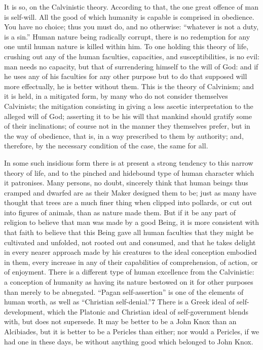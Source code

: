 \documentclass[11pt,openany]{book}
\begin{document}
It is so, on the Calvinistic theory. According to that, the one great offence of man is self-will. All the good of which humanity is capable is comprised in obedience. You have no choice; thus you must do, and no otherwise: ``whatever is not a duty, is a sin.'' Human nature being radically corrupt, there is no redemption for any one until human nature is killed within him. To one holding this theory of life, crushing out any of the human faculties, capacities, and susceptibilities, is no evil: man needs no capacity, but that of surrendering himself to the will of God: and if he uses any of his faculties for any other purpose but to do that supposed will more effectually, he is better without them. This is the theory of Calvinism; and it is held, in a mitigated form, by many who do not consider themselves Calvinists; the mitigation consisting in giving a less ascetic interpretation to the alleged will of God; asserting it to be his will that mankind should gratify some of their inclinations; of course not in the manner they themselves prefer, but in the way of obedience, that is, in a way prescribed to them by authority; and, therefore, by the necessary condition of the case, the same for all.

In some such insidious form there is at present a strong tendency to this narrow theory of life, and to the pinched and hidebound type of human character which it patronises. Many persons, no doubt, sincerely think that human beings thus cramped and dwarfed are as their Maker designed them to be; just as many have thought that trees are a much finer thing when clipped into pollards, or cut out into figures of animals, than as nature made them. But if it be any part of religion to believe that man was made by a good Being, it is more consistent with that faith to believe that this Being gave all human faculties that they might be cultivated and unfolded, not rooted out and consumed, and that he takes delight in every nearer approach made by his creatures to the ideal conception embodied in them, every increase in any of their capabilities of comprehension, of action, or of enjoyment. There is a different type of human excellence from the Calvinistic: a conception of humanity as having its nature bestowed on it for other purposes than merely to be abnegated. ``Pagan self-assertion'' is one of the elements of human worth, as well as ``Christian self-denial.''7 There is a Greek ideal of self-development, which the Platonic and Christian ideal of self-government blends with, but does not supersede. It may be better to be a John Knox than an Alcibiades, but it is better to be a Pericles than either; nor would a Pericles, if we had one in these days, be without anything good which belonged to John Knox.
\end{document}
